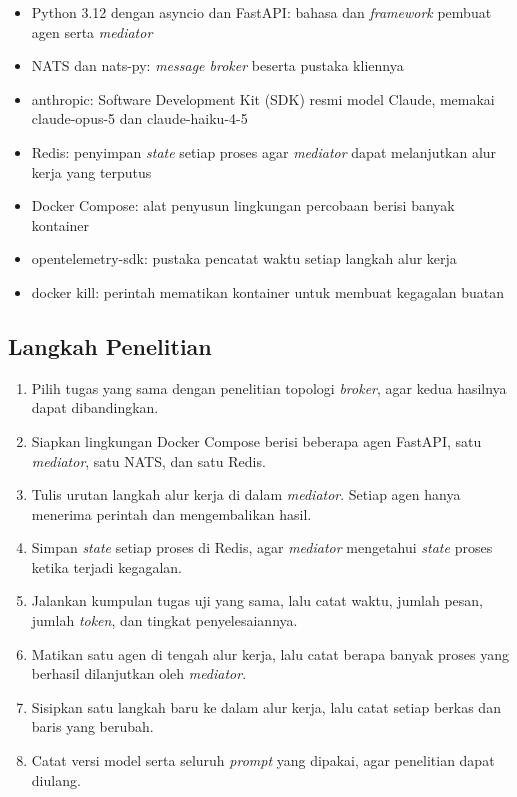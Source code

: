 \documentclass[11pt,a4paper]{article}
\begin{document}
\begin{itemize}[leftmargin=*]
  \item Python 3.12 dengan asyncio dan FastAPI: bahasa dan \textit{framework} pembuat agen serta \textit{mediator}
  \item NATS dan nats-py: \textit{message broker} beserta pustaka kliennya
  \item anthropic: Software Development Kit (SDK) resmi model Claude, memakai claude-opus-5 dan claude-haiku-4-5
  \item Redis: penyimpan \textit{state} setiap proses agar \textit{mediator} dapat melanjutkan alur kerja yang terputus
  \item Docker Compose: alat penyusun lingkungan percobaan berisi banyak kontainer
  \item opentelemetry-sdk: pustaka pencatat waktu setiap langkah alur kerja
  \item docker kill: perintah mematikan kontainer untuk membuat kegagalan buatan
\end{itemize}

\subsection{Langkah Penelitian}

\begin{enumerate}[leftmargin=*]
  \item Pilih tugas yang sama dengan penelitian topologi \textit{broker}, agar kedua hasilnya dapat dibandingkan.
  \item Siapkan lingkungan Docker Compose berisi beberapa agen FastAPI, satu \textit{mediator}, satu NATS, dan satu Redis.
  \item Tulis urutan langkah alur kerja di dalam \textit{mediator}. Setiap agen hanya menerima perintah dan mengembalikan hasil.
  \item Simpan \textit{state} setiap proses di Redis, agar \textit{mediator} mengetahui \textit{state} proses ketika terjadi kegagalan.
  \item Jalankan kumpulan tugas uji yang sama, lalu catat waktu, jumlah pesan, jumlah \textit{token}, dan tingkat penyelesaiannya.
  \item Matikan satu agen di tengah alur kerja, lalu catat berapa banyak proses yang berhasil dilanjutkan oleh \textit{mediator}.
  \item Sisipkan satu langkah baru ke dalam alur kerja, lalu catat setiap berkas dan baris yang berubah.
  \item Catat versi model serta seluruh \textit{prompt} yang dipakai, agar penelitian dapat diulang.
\end{enumerate}
\end{document}
